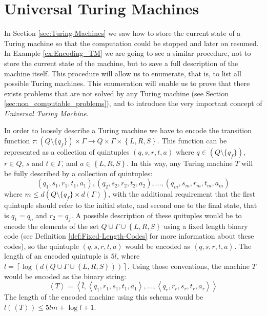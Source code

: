 %
%

\section{Universal Turing Machines}
\label{sec:Universal-Turing-Machines}

In Section \ref{sec:Turing-Machines} we saw how to store the current state of a Turing machine so that the computation could be stopped and later on resumed. In Example \ref{ex:Encoding_TM} we are going to see a similar procedure, not to store the current state of the machine, but to save a full description of the machine itself. This procedure will allow us to enumerate, that is, to list all possible Turing machines. This enumeration will enable us to prove that there exists problems that are not solved by any Turing machine (see Section \ref{sec:non_computable_problems}), and to introduce the very important concept of \emph{Universal Turing Machine}.

\begin{example}
\label{ex:Encoding_TM}
In order to loosely describe a Turing machine we have to encode the transition function $\tau:\left(Q\setminus \{q_{f}\}\right)\times\Gamma\rightarrow Q\times\Gamma\times\left\{ L,R,S\right\}$. This function can be represented as a collection of quintuples $\left(q,s,r,t,a\right)$ where $q \in \left(Q\setminus \{q_{f}\}\right)$, $r \in Q$, $s$ and $t\in\Gamma$, and $a\in\left\{ L,R,S\right\}$. In this way, any Turing machine $T$ will be fully described by a collection of quintuples:
\[
\left(q_{1},s_{1},r_{1},t_{1},a_{1}\right),\left(q_{2},s_{2},r_{2},t_{2},a_{2}\right),\ldots,\left(q_{m},s_
{m},r_{m},t_{m},a_{m}\right)
\]
where $m \leq d\left(Q\setminus \{q_{f}\} \times d(\Gamma) \right)$, with the additional requirement that the first quintuple should refer to the initial state, and second one to the final state, that is $q_{1} = q_{o}$ and $r_{2} = q_{f}$. A possible description of these quituples would be to encode the elements of the set $Q\cup\Gamma\cup\left\{ L, R, S \right\}$ using a fixed length binary code (see Definition \ref{def:Fixed-Length-Codes} for more information about these codes), so the quintuple $\left(q,s,r,t,a\right)$ would be encoded as $\left\langle q, s, r, t, a \right\rangle$. The length of an encoded quintuple is $5l$, where $l=\left\lceil \log\left(d\left(Q\cup\Gamma\cup\left\{ L,R,S\right\} \right)\right)\right\rceil$. Using those conventions, the machine $T$ would be encoded as the binary string:
\[
\left\langle T \right\rangle = \left\langle \bar{l}, \left\langle q_{1}, r_{1}, s_{1}, t_{1}, a_{1} \right\rangle, \ldots, \left\langle q_{r}, r_{r}, s_{r}, t_{r}, a_{r} \right\rangle \right\rangle 
\]
The length of the encoded machine using this schema would be $l(\left\langle T \right\rangle) \leq 5lm + \log l + 1$.
\end{example}

